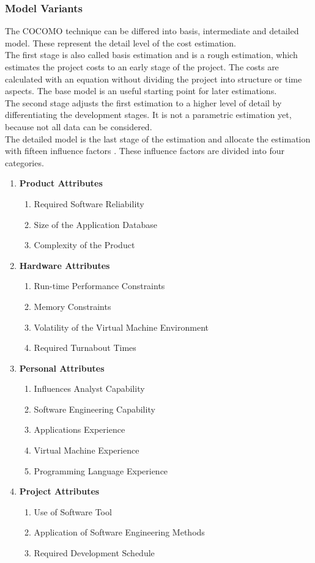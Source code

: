 \subsubsection{Model Variants}

The COCOMO technique can be differed into basis, intermediate and detailed model. These represent the detail level of the cost estimation.\\
The first stage is also called basis estimation and is a rough estimation, which estimates the project costs to an early stage of the project. The costs are calculated with an equation without dividing the project into structure or time aspects. The base model is an useful starting point for later estimations.\\
The second stage adjusts the first estimation to a higher level of detail by differentiating the development stages. It is not a parametric estimation yet, because not all data can be considered.\\
The detailed model is the last stage of the estimation and allocate the estimation with fifteen influence factors \cite{jenny}. These influence factors are divided into four categories.
\begin{enumerate}
	\item \textbf{Product Attributes}
	\begin{enumerate}
		\item Required Software Reliability
		\item Size of the Application Database
		\item Complexity of the Product
	\end{enumerate}
	\item \textbf{Hardware Attributes}
	\begin{enumerate}
		\item Run-time Performance Constraints
		\item Memory Constraints
		\item Volatility of the Virtual Machine Environment 
		\item Required Turnabout Times
	\end{enumerate}
	\item \textbf{Personal Attributes}
	\begin{enumerate}
		\item Influences Analyst Capability
		\item Software Engineering Capability
		\item Applications Experience
		\item Virtual Machine Experience
		\item Programming Language Experience
	\end{enumerate}
	\item \textbf{Project Attributes}
	\begin{enumerate}
		\item Use of Software Tool
		\item Application of Software Engineering Methods
		\item Required Development Schedule
	\end{enumerate}
\end{enumerate}

